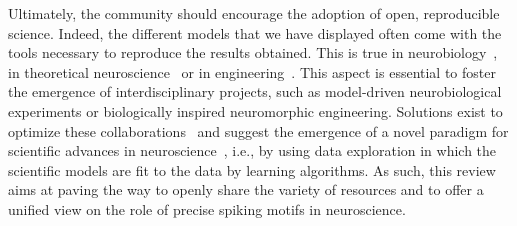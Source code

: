 \documentclass[brainsci, %
               review,accept,pdftex,moreauthors
               ]{Definitions/mdpi}
\begin{document}
Ultimately, the community should encourage the adoption of open, reproducible science. Indeed, the different models that we have displayed often come with the tools necessary to reproduce the results obtained. This is true in neurobiology~\citep{bellec_fitting_2021}, in theoretical neuroscience~\citep{izhikevich_polychronization_2006} or in engineering~\citep{grimaldi_robust_2022}. This aspect is essential to foster the emergence of interdisciplinary projects, such as model-driven neurobiological experiments or biologically inspired neuromorphic engineering. Solutions exist to optimize these collaborations~\citep{panahi_generative_2021} and suggest the emergence of a novel paradigm for scientific advances in neuroscience~\citep{tolle_fourth_2011}, i.e., by using data exploration in which the scientific models are fit to the data by learning algorithms. As such, this review aims at paving the way to openly share the variety of resources and to offer a unified view on the role of precise spiking motifs in neuroscience.
\vspace{6pt} 



\end{document}
